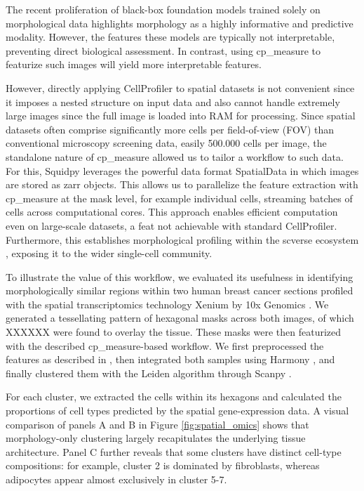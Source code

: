 \documentclass{article}
\begin{document}
The recent proliferation of black-box foundation models trained solely on morphological data \citep{Chen2024-ix, Xu2024-mn} highlights morphology as a highly informative and predictive modality. However, the features these models are typically not interpretable, preventing direct biological assessment. In contrast, using cp\_measure to featurize such images will yield more interpretable features.

However, directly applying CellProfiler to spatial datasets is not convenient since it imposes a nested structure on input data and also cannot handle extremely large images since the full image is loaded into RAM for processing. Since spatial datasets often comprise significantly more cells per field-of-view (FOV) than conventional microscopy screening data, easily 500.000 cells per image, the standalone nature of cp\_measure allowed us to tailor a workflow to such data. For this, Squidpy leverages the powerful data format SpatialData \citep{Marconato2024-SpatialData} in which images are stored as zarr objects. This allows us to parallelize the feature extraction with cp\_measure at the mask level, for example individual cells, streaming batches of cells across computational cores. This approach enables efficient computation even on large-scale datasets, a feat not achievable with standard CellProfiler. Furthermore, this establishes morphological profiling within the scverse ecosystem \citep{Virshup2023-scverse}, exposing it to the wider single-cell community.

To illustrate the value of this workflow, we evaluated its usefulness in identifying morphologically similar regions within two human breast cancer sections profiled with the spatial transcriptomics technology Xenium by 10x Genomics \citep{10x-Genomics2023-el}. We generated a tessellating pattern of hexagonal masks across both images, of which XXXXXX were found to overlay the tissue. These masks were then featurized with the described cp\_measure-based workflow. We first preprocessed the features as described in 
\citep{serranoReproducibleImagebasedProfiling2025}, then integrated both samples using Harmony \citep{Korsunsky2019-Harmony}, and finally clustered them with the Leiden algorithm through Scanpy \citep{wolfSCANPYLargescaleSinglecell2018}. 

For each cluster, we extracted the cells within its hexagons and calculated the proportions of cell types predicted by the spatial gene-expression data. A visual comparison of panels A and B in Figure \ref{fig:spatial_omics} shows that morphology-only clustering largely recapitulates the underlying tissue architecture. Panel C further reveals that some clusters have distinct cell-type compositions: for example, cluster 2 is dominated by fibroblasts, whereas adipocytes appear almost exclusively in cluster 5-7.
\end{document}

